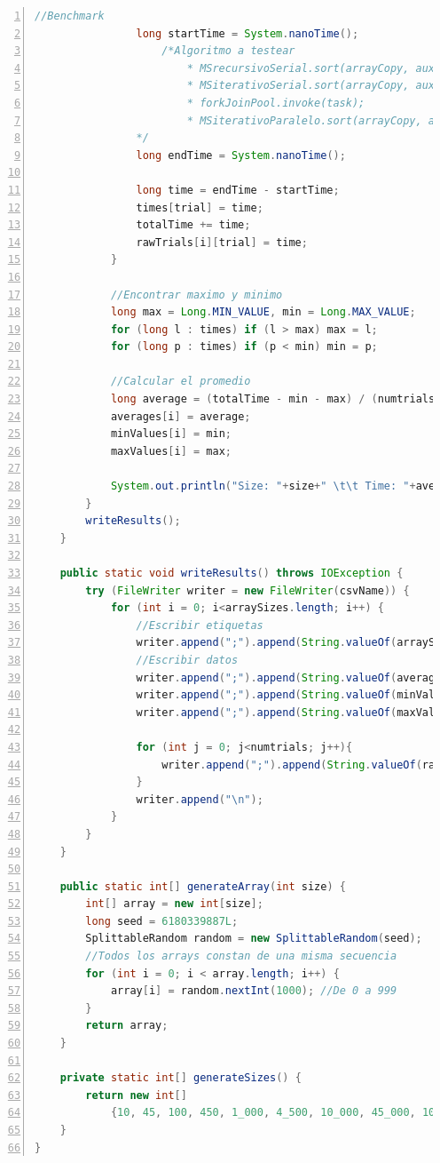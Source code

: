 \documentclass[titlepage]{article}
\begin{document}
	
	\begin{lstlisting}[language=java,frame=single,numbers=left,float=!hp]
				//Benchmark
				long startTime = System.nanoTime();
					/*Algoritmo a testear
						* MSrecursivoSerial.sort(arrayCopy, aux, 0, size-1);
						* MSiterativoSerial.sort(arrayCopy, aux);
						* forkJoinPool.invoke(task);
						* MSiterativoParalelo.sort(arrayCopy, aux, executorService);
				*/
				long endTime = System.nanoTime();
				
				long time = endTime - startTime;
				times[trial] = time;
				totalTime += time;
				rawTrials[i][trial] = time;
			}
			
			//Encontrar maximo y minimo
			long max = Long.MIN_VALUE, min = Long.MAX_VALUE;
			for (long l : times) if (l > max) max = l;
			for (long p : times) if (p < min) min = p;

			//Calcular el promedio
			long average = (totalTime - min - max) / (numtrials - 2);
			averages[i] = average;
			minValues[i] = min;
			maxValues[i] = max;
			
			System.out.println("Size: "+size+" \t\t Time: "+average);
		}
		writeResults();
	}

	public static void writeResults() throws IOException {
		try (FileWriter writer = new FileWriter(csvName)) {
			for (int i = 0; i<arraySizes.length; i++) {
				//Escribir etiquetas
				writer.append(";").append(String.valueOf(arraySizes[i]));
				//Escribir datos
				writer.append(";").append(String.valueOf(averages[i]));
				writer.append(";").append(String.valueOf(minValues[i]));
				writer.append(";").append(String.valueOf(maxValues[i]));
				
				for (int j = 0; j<numtrials; j++){
					writer.append(";").append(String.valueOf(rawTrials[i][j]));
				}
				writer.append("\n");
			}
		}
	}

	public static int[] generateArray(int size) {
		int[] array = new int[size];
		long seed = 6180339887L;
		SplittableRandom random = new SplittableRandom(seed);
		//Todos los arrays constan de una misma secuencia
		for (int i = 0; i < array.length; i++) {
			array[i] = random.nextInt(1000); //De 0 a 999
		}
		return array;
	}

	private static int[] generateSizes() {
		return new int[]
			{10, 45, 100, 450, 1_000, 4_500, 10_000, 45_000, 100_000, 450_000, 1_000_000, 4_500_000, 10_000_000, 45_000_000, 100_000_000};
	}
}	
	\end{lstlisting}
	
\newpage
{}
\end{document}
